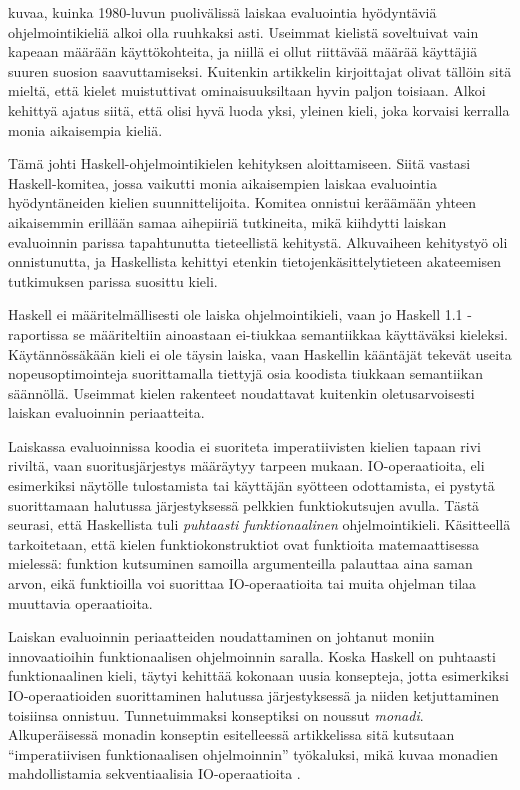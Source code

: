 \citet{hudak2007history} kuvaa, kuinka 1980-luvun puolivälissä laiskaa evaluointia hyödyntäviä ohjelmointikieliä alkoi olla ruuhkaksi asti. Useimmat kielistä soveltuivat vain kapeaan määrään käyttökohteita, ja niillä ei ollut riittävää määrää käyttäjiä suuren suosion saavuttamiseksi. Kuitenkin artikkelin kirjoittajat olivat tällöin sitä mieltä, että kielet muistuttivat ominaisuuksiltaan hyvin paljon toisiaan. Alkoi kehittyä ajatus siitä, että olisi hyvä luoda yksi, yleinen kieli, joka korvaisi kerralla monia aikaisempia kieliä.

Tämä johti Haskell-ohjelmointikielen kehityksen aloittamiseen. Siitä vastasi Haskell-komitea, jossa vaikutti monia aikaisempien laiskaa evaluointia hyödyntäneiden kielien suunnittelijoita. Komitea onnistui keräämään yhteen aikaisemmin erillään samaa aihepiiriä tutkineita, mikä kiihdytti laiskan evaluoinnin parissa tapahtunutta tieteellistä kehitystä. Alkuvaiheen kehitystyö oli onnistunutta, ja Haskellista kehittyi etenkin tietojenkäsittelytieteen akateemisen tutkimuksen parissa suosittu kieli.

Haskell ei määritelmällisesti ole laiska ohjelmointikieli, vaan jo Haskell 1.1 -raportissa \citep{yale1991report} se määriteltiin ainoastaan ei-tiukkaa semantiikkaa käyttäväksi kieleksi. Käytännössäkään kieli ei ole täysin laiska, vaan Haskellin kääntäjät tekevät useita nopeusoptimointeja suorittamalla tiettyjä osia koodista tiukkaan semantiikan säännöllä. Useimmat kielen rakenteet noudattavat kuitenkin oletusarvoisesti laiskan evaluoinnin periaatteita.

Laiskassa evaluoinnissa koodia ei suoriteta imperatiivisten kielien tapaan rivi riviltä, vaan suoritusjärjestys määräytyy tarpeen mukaan. IO-operaatioita, eli esimerkiksi näytölle tulostamista tai käyttäjän syötteen odottamista, ei pystytä suorittamaan halutussa järjestyksessä pelkkien funktiokutsujen avulla. Tästä seurasi, että Haskellista tuli \textit{puhtaasti funktionaalinen} ohjelmointikieli. Käsitteellä tarkoitetaan, että kielen funktiokonstruktiot ovat funktioita matemaattisessa mielessä: funktion kutsuminen samoilla argumenteilla palauttaa aina saman arvon, eikä funktioilla voi suorittaa IO-operaatioita tai muita ohjelman tilaa muuttavia operaatioita.

Laiskan evaluoinnin periaatteiden noudattaminen on johtanut moniin innovaatioihin funktionaalisen ohjelmoinnin saralla. Koska Haskell on puhtaasti funktionaalinen kieli, täytyi kehittää kokonaan uusia konsepteja, jotta esimerkiksi IO-operaatioiden suorittaminen halutussa järjestyksessä ja niiden ketjuttaminen toisiinsa onnistuu. Tunnetuimmaksi konseptiksi on noussut \textit{monadi}. Alkuperäisessä monadin konseptin esitelleessä artikkelissa sitä kutsutaan ``imperatiivisen funktionaalisen ohjelmoinnin'' työkaluksi, mikä kuvaa monadien mahdollistamia sekventiaalisia IO-operaatioita \citep{PeytonJones199371}.

